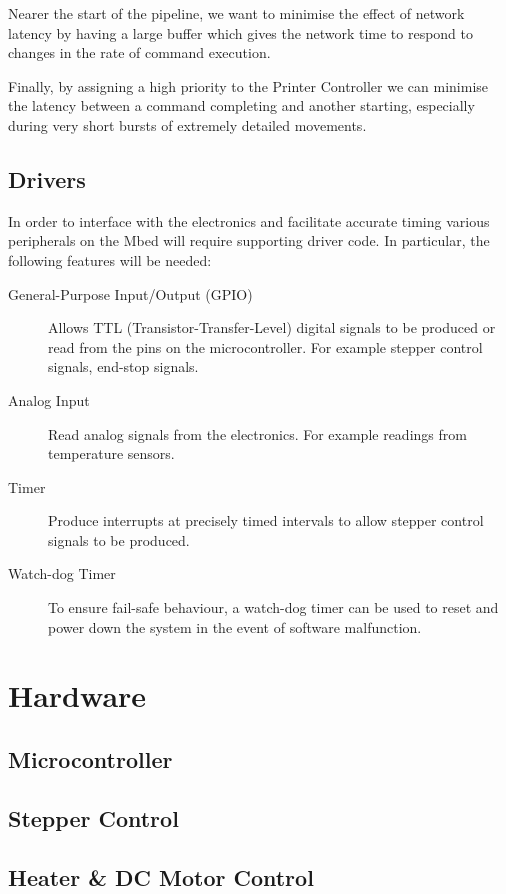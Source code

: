 			Nearer the start of the pipeline, we want to minimise the effect of
			network latency by having a large buffer which gives the network time to
			respond to changes in the rate of command execution.
			
			
			Finally, by assigning a high priority to the Printer Controller we can
			minimise the latency between a command completing and another starting,
			especially during very short bursts of extremely detailed movements.
		
		\subsection{Drivers}
			
			In order to interface with the electronics and facilitate accurate timing
			various peripherals on the Mbed will require supporting driver code. In
			particular, the following features will be needed:
			
			\begin{description}
				\item[General-Purpose Input/Output (GPIO)]
					Allows TTL (Transistor-Transfer-Level) digital signals to be produced
					or read from the pins on the microcontroller. For example stepper
					control signals, end-stop signals.
				
				\item[Analog Input]
					Read analog signals from the electronics. For example readings from
					temperature sensors.
				
				\item[Timer]
					Produce interrupts at precisely timed intervals to allow stepper
					control signals to be produced.
				
				\item[Watch-dog Timer]
					To ensure fail-safe behaviour, a watch-dog timer can be used to reset
					and power down the system in the event of software malfunction.
			\end{description}
	
	\section{Hardware}
		
		\subsection{Microcontroller}
		
		\subsection{Stepper Control}
		
		\subsection{Heater \& DC Motor Control}
	
